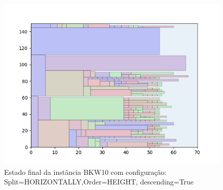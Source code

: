 \begin{figure}[H]
    \centering
    \caption[]{Estado final da instância BKW10 com configuração: Split=HORIZONTALLY,Order=HEIGHT, descending=True}
    \label{fig:bkw10-horizontally-height-true}
    \includegraphics[scale=0.5]{output/figures/bkw/bkw10/horizontally/height/true/000}
\end{figure}